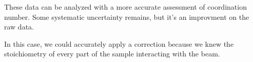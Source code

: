 \documentclass[10pt, xcolor=x11names, compress, handout]{beamer}
\begin{document}
\begin{frame}
\begin{columns}
\begin{column}{0.33\linewidth}
    \end{column}
  \end{columns}

  \bigskip

  These data can be analyzed with a more accurate assessment of
  coordination number.  Some systematic uncertainty remains, but it's
  an improvment on the raw data.

  \bigskip

  \begin{exampleblock}{}
    In this case, we could accurately apply a correction because we
    knew the stoichiometry of every part of the sample interacting
    with the beam.
  \end{exampleblock}

\end{frame}
\end{document}
